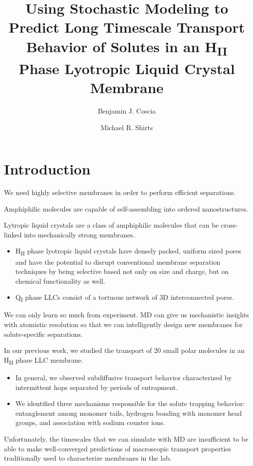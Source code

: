 \documentclass{article}
\title{Using Stochastic Modeling to Predict Long Timescale Transport Behavior of Solutes in an H\textsubscript{II} Phase Lyotropic Liquid Crystal Membrane}
\author{Benjamin J. Coscia \and Michael R. Shirts}
\begin{document}
  \graphicspath{{./figures/}}
  \maketitle

  \section{Introduction}
  We need highly selective membranes in order to perform efficient separations.

  Amphiphilic molecules are capable of self-assembling into ordered nanostructures.

  Lytropic liquid crystals are a class of amphiphilic molecules that can be cross-linked
  into mechanically strong membranes.
  \begin{itemize}
  	\item H\textsubscript{II} phase lyotropic liquid crystals have densely packed, uniform
	sized pores and have the potential to disrupt conventional membrane separation
	techniques by being selective based not only on size and charge, but on chemical
	functionality as well.
	\item Q\textsubscript{I} phase LLCs consist of a tortuous network of 3D interconnected
	pores.
  \end{itemize}

  We can only learn so much from experiment. MD can give us mechanistic insights with
  atomistic resolution so that we can intelligently design new membranes for 
  solute-specific separations.

  In our previous work, we studied the transport of 20 small polar molecules
  in an H\textsubscript{II} phase LLC membrane.
  \begin{itemize}
    \item In general, we observed subdiffusive transport behavior characterized 
    by intermittent hops separated by periods of entrapment.
    \item We identified three mechanisms responsible for the solute trapping behavior:
    entanglement among monomer tails, hydrogen bonding with monomer head groups, and
    association with sodium counter ions.
  \end{itemize}

  Unfortunately, the timescales that we can simulate with MD are insufficient to be
  able to make well-converged predictions of macroscopic transport properties 
  traditionally used to characterize membranes in the lab.
\end{document}
